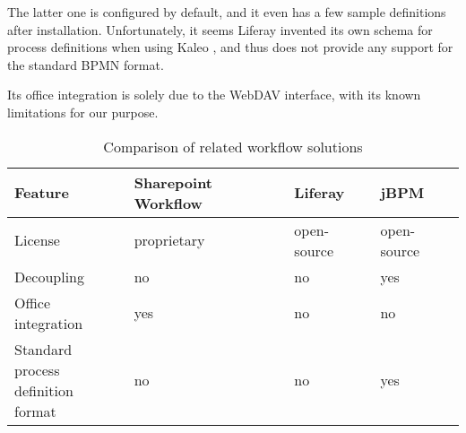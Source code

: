 The latter one is configured by default, and it even has a few sample definitions
after installation. Unfortunately, it seems Liferay invented its own schema for process
definitions when using Kaleo \cite{liferay-kaleo}, and thus does not provide
any support for the standard BPMN format.

Its office integration is solely due to the WebDAV interface, with its known
limitations for our purpose.

\begin{table}[H]
  \begin{center}
    \begin{tabular}{| l | l | l | l |}
    \hline
    \textbf{Feature} & \textbf{Sharepoint Workflow} & \textbf{Liferay} & \textbf{jBPM} \\ \hline
    License          & proprietary                  & open-source      & open-source \\ \hline
    Decoupling       & no                           & no               & yes \\ \hline
    Office integration & yes                        & no               & no \\ \hline
    \makecell[l]{Standard process \\ definition format} & no & no      & yes \\ \hline
    \end{tabular}
  \end{center}
  \caption{Comparison of related workflow solutions}
  \label{tab:related-wf-cmp}
\end{table}

